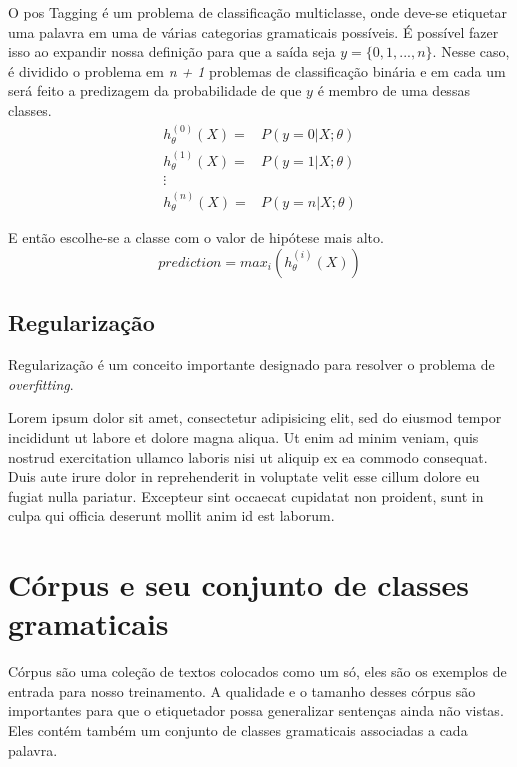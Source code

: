 O \ac{pos} Tagging é um problema de classificação multiclasse, onde deve-se etiquetar uma palavra em uma de várias categorias gramaticais possíveis. É possível fazer isso ao expandir nossa definição para que a saída seja $y = \{0, 1, ..., n\}$. Nesse caso, é dividido o problema em \textit{n + 1} problemas de classificação binária e em cada um será feito a predizagem da probabilidade de que $y$ é membro de uma dessas classes.
\begin{align}
h_{\theta}^{(0)}(X) =&  P(y=0 | X ; \theta) \nonumber \\
h_{\theta}^{(1)}(X) =&  P(y=1 | X ; \theta) \nonumber \\
\vdots & \nonumber \\
h_{\theta}^{(n)}(X) =&  P(y=n | X ; \theta) \nonumber
\end{align}

E então escolhe-se a classe com o valor de hipótese mais alto.
\begin{equation}
prediction = max_i(h_{\theta}^{(i)}(X)) \nonumber
\end{equation}


\subsection{Regularização}

Regularização é um conceito importante designado para resolver o problema de \textit{overfitting}.

Lorem ipsum dolor sit amet, consectetur adipisicing elit, sed do eiusmod
tempor incididunt ut labore et dolore magna aliqua. Ut enim ad minim veniam,
quis nostrud exercitation ullamco laboris nisi ut aliquip ex ea commodo
consequat. Duis aute irure dolor in reprehenderit in voluptate velit esse
cillum dolore eu fugiat nulla pariatur. Excepteur sint occaecat cupidatat non
proident, sunt in culpa qui officia deserunt mollit anim id est laborum.



\section{Córpus e seu conjunto de classes gramaticais}

Córpus são uma coleção de textos colocados como um só, eles são os exemplos de entrada para nosso treinamento. A qualidade e o tamanho desses córpus são importantes para que o etiquetador possa generalizar sentenças ainda não vistas. Eles contém também um conjunto de classes gramaticais associadas a cada palavra.

